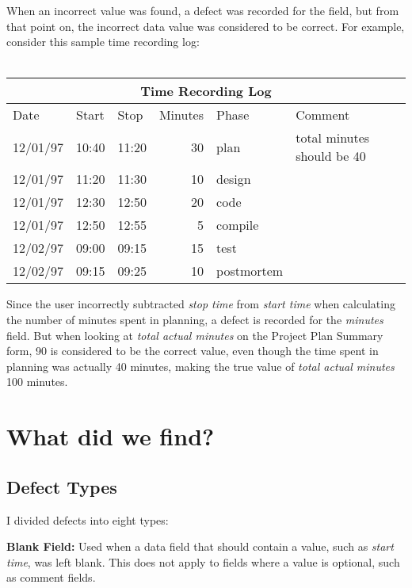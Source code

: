 When an incorrect value was found, a defect was recorded for the field,
but from that point on, the incorrect data value was considered to be
correct.  For example, consider this sample time recording log: \\ \\

\begin{center}
\begin{tabular}{|l|l|l|r|l|l|} \hline
\multicolumn{6}{|c|}{\bf Time Recording Log}\\ \hline
Date & Start & Stop & Minutes & Phase & Comment \\ \hline\hline
12/01/97 & 10:40 & 11:20 & 30 & plan       & total minutes should be 40 
\\ \hline
12/01/97 & 11:20 & 11:30 & 10 & design     & \\ \hline
12/01/97 & 12:30 & 12:50 & 20 & code       & \\ \hline
12/01/97 & 12:50 & 12:55 &  5 & compile    & \\ \hline
12/02/97 & 09:00 & 09:15 & 15 & test       & \\ \hline
12/02/97 & 09:15 & 09:25 & 10 & postmortem & \\ \hline
\end{tabular}
\end{center}

Since the user incorrectly subtracted {\it stop time} from {\it start 
time}
when calculating the number of minutes spent in planning, a defect
is recorded for the {\it minutes} field.  But when looking at {\it total 
actual
minutes} on the Project Plan Summary form, 90 is considered to be the
correct value, even though the time spent in planning was
actually 40 minutes, making the true value of {\it total actual minutes}
100 minutes.

\section{What did we find?}

\subsection{Defect Types}
I divided defects into eight types:\newline

{\bf Blank Field:}
Used when a data field that should contain a value, such as {\it start 
time},
was left blank.  This does not apply to fields where a value is
optional, such as comment fields.

